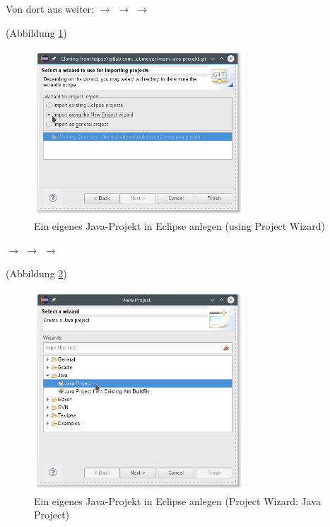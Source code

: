 Von dort aus weiter: $\rightarrow$  $\rightarrow$ 
$\rightarrow$  

(Abbildung \ref{fig:import-project-from-git-using-wizard-1})

\begin{figure}[h]
  \centering
   \includegraphics[width=0.70\textwidth]{./inf/SEKII/01_Vorbereitung/Import_Project_from_Git_using_Project_Wizard_1.png}
   \caption{Ein eigenes Java-Projekt in Eclipse anlegen (using Project Wizard)}
   \label{fig:import-project-from-git-using-wizard-1}
\end{figure}

$\rightarrow$  $\rightarrow$  $\rightarrow$

(Abbildung \ref{fig:import-project-from-git-using-wizard-2})

\begin{figure}[h]
  \centering
   \includegraphics[width=0.70\textwidth]{./inf/SEKII/01_Vorbereitung/Import_Project_from_Git_using_Project_Wizard_2.png}
   \caption{Ein eigenes Java-Projekt in Eclipse anlegen (Project Wizard: Java Project)}
   \label{fig:import-project-from-git-using-wizard-2}
\end{figure}

